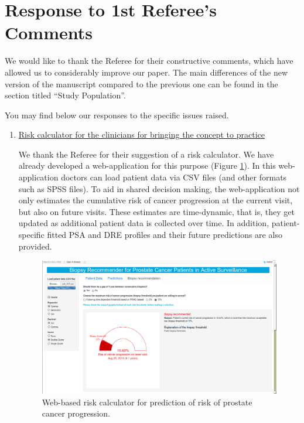 		\clearpage
		\section*{Response to 1st Referee's Comments}
		We would like to thank the Referee for their constructive comments, which have allowed us to considerably improve our paper. The main differences of the new version of the manuscript compared to the previous one can be found in the section titled ``Study Population''.

		You may find below our responses to the specific issues raised.

		\begin{enumerate}

		    \item \underline{Risk calculator for the clinicians for bringing the concept to practice}

		    We thank the Referee for their suggestion of a risk calculator. We have already developed a web-application for this purpose (Figure \ref{fig:webapp}). In this web-application doctors can load patient data via CSV files (and other formats such as SPSS files). To aid in shared decision making, the web-application not only estimates the cumulative risk of cancer progression at the current visit, but also on future visits. These estimates are time-dynamic, that is, they get updated as additional patient data is collected over time. In addition, patient-specific fitted PSA and DRE profiles and their future predictions are also provided. 

		    \begin{figure}[!htb]
	    		\centerline{\includegraphics[width=0.8\columnwidth]{../images/webapp.png}}
				\caption{Web-based risk calculator for prediction of risk of prostate cancer progression.}
				\label{fig:webapp}
			\end{figure}


\end{enumerate}
